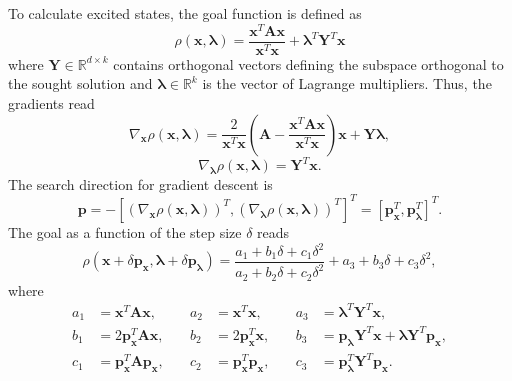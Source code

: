 To calculate excited states, the goal function is defined as
\begin{equation}
	\rho\left(\mathbf{x}, \bm{\lambda} \right) = \frac{\mathbf{x}^T\mathbf{A}\mathbf{x}}{\mathbf{x}^T\mathbf{x}} + \bm{\lambda}^T \mathbf{Y}^T \mathbf{x}
\end{equation}
\noindent where $\mathbf{Y}\in\mathbb{R}^{d \times k}$ contains orthogonal vectors defining the subspace orthogonal to the sought solution and $\bm{\lambda}\in\mathbb{R}^k$ is the vector of Lagrange multipliers.
Thus, the gradients read
\begin{equation}
	\nabla_{\mathbf{x}}\rho\left(\mathbf{x},\bm{\lambda}\right) = \frac{2}{\mathbf{x}^T\mathbf{x}}\left(\mathbf{A}-\frac{\mathbf{x}^T\mathbf{A}\mathbf{x}}{\mathbf{x}^T\mathbf{x}}\right)\mathbf{x} + \mathbf{Y}\bm{\lambda},
\end{equation}
\begin{equation}
	\nabla_{\bm{\lambda}}\rho\left(\mathbf{x},\bm{\lambda}\right) = \mathbf{Y}^T\mathbf{x}.
\end{equation}
The search direction for gradient descent is
\begin{equation}
	\mathbf{p}=-\left[\left(\nabla_{\mathbf{x}}\rho\left(\mathbf{x},\bm{\lambda}\right)\right)^T, \left(\nabla_{\bm{\lambda}}\rho\left(\mathbf{x},\bm{\lambda}\right)\right)^T\right]^T = \left[\mathbf{p}_{\mathbf{x}}^T,\mathbf{p}_{\bm{\lambda}}^T\right]^T.
\end{equation}
\noindent The goal as a function of the step size $\delta$ reads
\begin{equation}
	\rho\left(\mathbf{x}+\delta \mathbf{p}_{\mathbf{x}},\bm{\lambda}+\delta \mathbf{p}_{\bm{\lambda}}\right) = \frac{a_1+b_1\delta+c_1\delta^2}{a_2+b_2\delta+c_2\delta^2} + a_3+b_3\delta + c_3 \delta^2,
	\label{eq5}
\end{equation}
where
\begin{align*}
	a_1 &= \mathbf{x}^T\mathbf{A}\mathbf{x}, & \quad a_2 &= \mathbf{x}^T\mathbf{x}, & \quad a_3 &= \bm{\lambda}^T\mathbf{Y}^T\mathbf{x}, \\
	b_1 &= 2 \mathbf{p}_{\mathbf{x}}^T\mathbf{A}\mathbf{x}, & \quad b_2 &= 2\mathbf{p}_{\mathbf{x}}^T\mathbf{x}, & \quad b_3 &=  \mathbf{p}_{\bm{\lambda}} \mathbf{Y}^T \mathbf{x} + \bm{\lambda}\mathbf{Y}^T\mathbf{p}_{\mathbf{x}}, \\
	c_1 &= \mathbf{p}_{\mathbf{x}}^T \mathbf{A} \mathbf{p}_{\mathbf{x}}, & \quad c_2 &= \mathbf{p}_{\mathbf{x}}^T\mathbf{p}_{\mathbf{x}}, &  \quad c_3 &= \mathbf{p}_{\bm{\lambda}}^T\mathbf{Y}^T\mathbf{p}_{\mathbf{x}}.
\end{align*}

